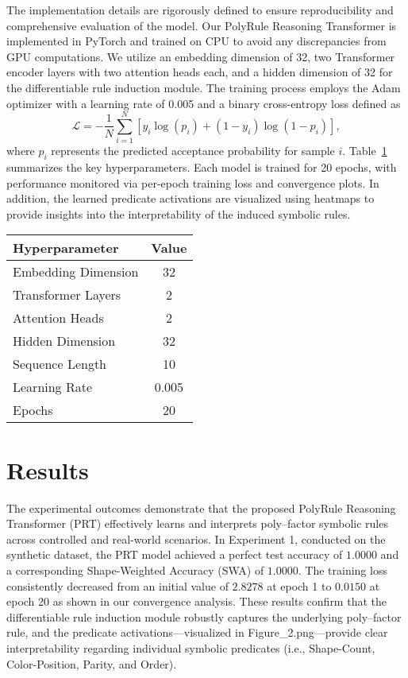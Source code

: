 \documentclass{article}
\begin{document}
The implementation details are rigorously defined to ensure reproducibility and comprehensive evaluation of the model. Our PolyRule Reasoning Transformer is implemented in PyTorch and trained on CPU to avoid any discrepancies from GPU computations. We utilize an embedding dimension of 32, two Transformer encoder layers with two attention heads each, and a hidden dimension of 32 for the differentiable rule induction module. The training process employs the Adam optimizer with a learning rate of 0.005 and a binary cross-entropy loss defined as
\[
\mathcal{L} = -\frac{1}{N} \sum_{i=1}^{N} \left[y_i \log(p_i) + (1-y_i) \log(1-p_i)\right],
\]
where \(p_i\) represents the predicted acceptance probability for sample \(i\). Table~\ref{tab:exp-hyper} summarizes the key hyperparameters. Each model is trained for 20 epochs, with performance monitored via per-epoch training loss and convergence plots. In addition, the learned predicate activations are visualized using heatmaps to provide insights into the interpretability of the induced symbolic rules.

\begin{table}[h]
\centering
\begin{tabular}{|l|c|}
\hline
\textbf{Hyperparameter} & \textbf{Value} \\
\hline
Embedding Dimension & 32 \\
Transformer Layers & 2 \\
Attention Heads & 2 \\
Hidden Dimension & 32 \\
Sequence Length & 10 \\
Learning Rate & 0.005 \\
Epochs & 20 \\
\hline
\end{tabular}
\label{tab:exp-hyper}
\end{table}

\section{Results}
The experimental outcomes demonstrate that the proposed PolyRule Reasoning Transformer (PRT) effectively learns and interprets poly–factor symbolic rules across controlled and real-world scenarios. In Experiment 1, conducted on the synthetic dataset, the PRT model achieved a perfect test accuracy of $1.0000$ and a corresponding Shape-Weighted Accuracy (SWA) of $1.0000$. The training loss consistently decreased from an initial value of $2.8278$ at epoch 1 to $0.0150$ at epoch 20 as shown in our convergence analysis. These results confirm that the differentiable rule induction module robustly captures the underlying poly–factor rule, and the predicate activations—visualized in Figure\_2.png—provide clear interpretability regarding individual symbolic predicates (i.e., Shape-Count, Color-Position, Parity, and Order).
\end{document}
